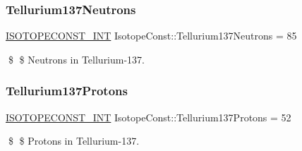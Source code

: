 \subsubsection{\texorpdfstring{Tellurium137\+Neutrons}{Tellurium137Neutrons}}
{\footnotesize\ttfamily \mbox{\hyperlink{group___isotope_const-_macros_ga5f18360b3e99483a35c32d789e62621c}{I\+S\+O\+T\+O\+P\+E\+C\+O\+N\+S\+T\+\_\+\+I\+NT}} Isotope\+Const\+::\+Tellurium137\+Neutrons = 85}

\$ \$ Neutrons in Tellurium-\/137. \mbox{\label{group___isotope_const-_tellurium-_te137_gaf9aab29db54ea0d6ea2b1700ac18f155}} 
\subsubsection{\texorpdfstring{Tellurium137\+Protons}{Tellurium137Protons}}
{\footnotesize\ttfamily \mbox{\hyperlink{group___isotope_const-_macros_ga5f18360b3e99483a35c32d789e62621c}{I\+S\+O\+T\+O\+P\+E\+C\+O\+N\+S\+T\+\_\+\+I\+NT}} Isotope\+Const\+::\+Tellurium137\+Protons = 52}

\$ \$ Protons in Tellurium-\/137. 